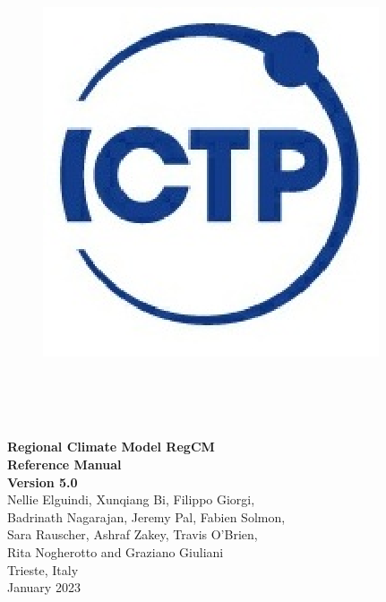 \documentclass[10pt,twoside,a4paper]{report}
\begin{document}
\begin{titlepage}

\begin{figure}
\vspace{-35pt}
\begin{center}
\includegraphics{ICTP_logo}
\end{center}
\end{figure}

\\
 \\
 \\

\vspace{3cm}

\begin{boxedminipage}{\textwidth}
\begin{center}
\vspace{0.5cm}
{\Large
{\bf Regional Climate Model RegCM\\Reference Manual} \\
\vspace{0.2cm}
{\bf Version 5.0}}\\
\vspace{0.5cm}
Nellie Elguindi, Xunqiang Bi, Filippo Giorgi,\\
Badrinath Nagarajan, Jeremy Pal, Fabien Solmon,\\
Sara Rauscher, Ashraf Zakey, Travis O'Brien,\\
Rita Nogherotto and Graziano Giuliani\\
Trieste, Italy\\January 2023
\vspace{0.5cm}
\end{center}
\end{boxedminipage}

\end{titlepage}

\cleardoublepage

\cleardoublepage
\tableofcontents
\cleardoublepage

\listoffigures
\listoftables
\cleardoublepage











\end{document}
